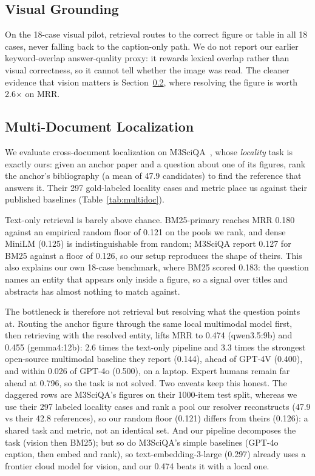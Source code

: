 \documentclass[letterpaper]{article} %
\begin{document}
\subsection{Visual Grounding}
On the 18-case visual pilot, retrieval routes to the correct figure or table in all 18 cases,
never falling back to the caption-only path. We do not report our earlier keyword-overlap
answer-quality proxy: it rewards lexical overlap rather than visual correctness, so it cannot tell
whether the image was read. The cleaner evidence that vision matters is
Section~\ref{sec:auto-multidoc}, where resolving the figure is worth 2.6$\times$ on MRR.

\subsection{Multi-Document Localization}
\label{sec:auto-multidoc}
We evaluate cross-document localization on M3SciQA~\citep{li2024m3sciqa}, whose \emph{locality}
task is exactly ours: given an anchor paper and a question about one of its figures, rank the
anchor's bibliography (a mean of 47.9 candidates) to find the reference that answers it. Their
297 gold-labeled locality cases and metric place us against their published baselines
(Table~\ref{tab:multidoc}).

Text-only retrieval is barely above chance. BM25-primary reaches MRR 0.180 against an empirical
random floor of 0.121 on the pools we rank, and dense MiniLM (0.125) is indistinguishable from
random; M3SciQA report 0.127 for BM25 against a floor of 0.126, so our setup reproduces the
shape of theirs. This also explains our own 18-case benchmark, where BM25 scored 0.183: the
question names an entity that appears only inside a figure, so a signal over titles and
abstracts has almost nothing to match against.

The bottleneck is therefore not retrieval but resolving what the question points at. Routing the
anchor figure through the same local multimodal model first, then retrieving with the resolved
entity, lifts MRR to 0.474 (qwen3.5:9b) and 0.455 (gemma4:12b): 2.6 times the text-only pipeline
and 3.3 times the strongest open-source multimodal baseline they report (0.144), ahead of GPT-4V
(0.400), and within 0.026 of GPT-4o (0.500), on a laptop. Expert humans remain far ahead at
0.796, so the task is not solved. Two caveats keep this honest. The daggered rows are M3SciQA's
figures on their 1000-item test split, whereas we use their 297 labeled locality cases and rank a
pool our resolver reconstructs (47.9 vs their 42.8 references), so our random floor (0.121) differs
from theirs (0.126): a shared task and metric, not an identical set. And our pipeline decomposes the
task (vision then BM25); but so do M3SciQA's simple baselines (GPT-4o caption, then embed and rank),
so text-embedding-3-large (0.297) already uses a frontier cloud model for vision, and our 0.474
beats it with a local one.
\end{document}
